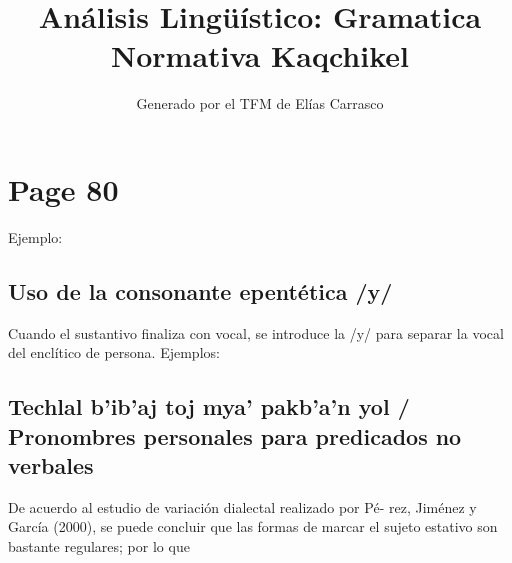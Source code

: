 \documentclass{article}%
\title{Análisis Lingüístico: Gramatica Normativa Kaqchikel}%
\author{Generado por el TFM de Elías Carrasco}%
\begin{document}
%
\normalsize%
\maketitle%
\section{Page 80}%
\label{sec:Page80}%
Ejemplo: %
\subsection{Uso de la consonante epentética /y/}%
\label{subsec:Usodelaconsonanteepenttica/y/}%

%
Cuando el sustantivo finaliza con vocal, se introduce la /y/ para %
separar la vocal del enclítico de persona. %
Ejemplos: %
\subsection{Techlal b'ib'aj toj mya' pakb'a'n yol / Pronombres personales para predicados no verbales}%
\label{subsec:Techlalbibajtojmyapakbanyol/Pronombrespersonalesparapredicadosnoverbales}%

%
De acuerdo al estudio de variación dialectal realizado por Pé{-} %
rez, Jiménez y García (2000), se puede concluir que las formas %
de marcar el sujeto estativo son bastante regulares; por lo que 

%
\end{document}
